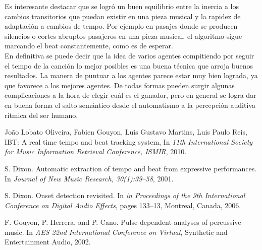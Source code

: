 \documentclass[12pt,a4paper,titlepage]{report}
\begin{document}
Es interesante destacar que se logró un buen equilibrio entre la inercia a los cambios transitorios que puedan existir en una pieza musical y la rapidez de adaptación a cambios de tempo. Por ejemplo en pasajes donde se producen silencios o cortes abruptos pasajeros en una pieza musical, el algoritmo sigue marcando el beat constantemente, como es de esperar.\\

En definitiva se puede decir que la idea de varios agentes compitiendo por seguir el tempo de la canción lo mejor posibles es una buena técnica que arroja buenos resultados. La manera de puntuar a los agentes parece estar muy bien lograda, ya que favorece a los mejores agentes. De todas formas pueden surgir algunas complicaciones a la hora de elegir cuál es el ganador, pero en general se logra dar en buena forma el salto semántico desde el automatismo a la percepción auditiva rítmica del ser humano.

\begin{thebibliography}{99}
\begin{small}

Jo\~ao Lobato Oliveira, Fabien Gouyon, Luis Gustavo Martins, Luis Paulo Reis, IBT: A real time tempo and beat tracking system, In \emph{11th International Society for Music Information Retrieval Conference, ISMIR}, 2010.

S. Dixon. Automatic extraction of tempo and beat from
expressive performances. In \emph{Journal of New Music Research, 30(1):39–58}, 2001.

S. Dixon. Onset detection revisited. In \emph{in Proceedings of the 9th International Conference on Digital Audio Effects}, pages 133–13, Montreal, Canada, 2006.

F. Gouyon, P. Herrera, and P. Cano. Pulse-dependent analyses of percussive music. In \emph{AES 22nd International Conference on Virtual}, Synthetic and Entertainment Audio, 2002.

\end{small}
\end{thebibliography}
\end{document}
